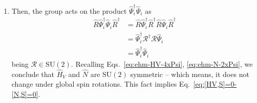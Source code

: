 \begin{tabproof}[Proof of Eq.~\eqref{eq:[HV,S]=0-[N,S]=0}: $\hat H_V$ and $\hat N$ are $\mathrm{SU}(2)$ symmetric.]
\begin{enumerate}
		\[
		\begin{aligned}
			[i \bm{\theta} \cdot \hat{\mathbf{S}}, \hat \Psi_i] &= i \sum_\alpha \theta_\alpha [\hat S^\alpha, \hat \Psi_i] \\
			&= -\frac{i}{2} \sum_\alpha \theta_\alpha \tau^\alpha \hat{\Psi}_i \\
			&= -\frac{i}{2} \bm{\theta} \cdot \bm{\tau} \hat \Psi_i \, .
		\end{aligned}
		\]
		We omitted some purely algebraic passages. The second order is given by
		\[
			\begin{aligned}
				\comm{
					i \bm{\theta} \cdot \hat{\mathbf{S}}
				}{
					\comm{ i \bm{\theta} \cdot \hat{\mathbf{S}} }{ \hat{\Psi}_i }
				}
				&= \comm{
					i \bm{\theta} \cdot \hat{\mathbf{S}}
				}{
					-\frac{i}{2} (\bm{\theta} \cdot \bm{\tau}) \hat \Psi_i
				} \\
				&= -\frac{i}{2} \bm{\theta} \cdot \bm{\tau} \comm{
					i \bm{\theta} \cdot \hat{\mathbf{S}}
				}{
					\Psi_i
				} \\
				&= \frac{1}{4} (\bm{\theta} \cdot \bm{\tau})^2 \hat{\Psi}_i \, ,
			\end{aligned}
		\]
		and so on. Collecting all terms, we obtain
		\[
		\begin{aligned}
			\hat R (\bm{\theta}) \hat \Psi_i \hat R (\bm{\theta})^\dagger &= \hat \Psi_i -\frac{i}{2} \bm{\theta} \cdot \bm{\tau} \hat \Psi_i + \frac{1}{2! \times 4} (\bm{\theta} \cdot \bm{\tau})^2 \hat{\Psi}_i + \cdots \\
			&= \sum_{k=1}^\infty \frac{1}{k!} \left( - \frac{i}{2} \bm{\theta} \cdot \bm{\tau} \right)^k \hat \Psi_i \\
			&= \mathcal{R}(\bm{\theta}) \hat \Psi_i \, .
		\end{aligned}
		\]
		In the last line, we identified the series as the Taylor expansion of the exponential, recognising the expression for $\mathcal{R}(\bm{\theta})$ given in Eq.~\eqref{eq:ehm-R-exp}.
		\item Then, the group acts on the product $\hat \Psi_i^\dagger \hat \Psi_i$ as
		\[
			\begin{aligned}
				\hat R \hat \Psi_i^\dagger \hat \Psi_i \hat R^\dagger &= \hat R \hat \Psi_i^\dagger \hat R^\dagger \hat R \hat \Psi_i \hat R^\dagger \\
				&= \hat \Psi_i^\dagger \mathcal{R}^\dagger \mathcal{R} \hat \Psi_i\\
				&= \hat \Psi_i^\dagger \hat \Psi_i
			\end{aligned}
		\]
		being $\mathcal{R} \in \mathrm{SU}(2)$. Recalling Eqs.~\eqref{eq:ehm-HV-4xPsi}, \eqref{eq:ehm-N-2xPsi}, we conclude that $\hat H_V$ and $\hat N$ are $\mathrm{SU}(2)$ symmetric -- which means, it does not change under global spin rotations. This fact implies Eq.~\eqref{eq:[HV,S]=0-[N,S]=0}.
	\end{enumerate}
\end{tabproof}
